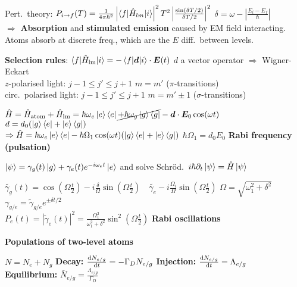 \begin{squishlist}
    \item Pert.\ theory: $P_{i\rightarrow f}(T) = \frac{1}{4\pi \hbar^2} \left|\braket{f|\ham_{lm}|i}\right|^2 T^2 \left|\frac{\sin(\delta T / 2)}{\delta T / 2}\right|^2$ \quad $\delta = \omega - \left|\frac{E_i - E_f}{\hbar}\right|$ \\
    $\Longrightarrow$ \textbf{Absorption} and \textbf{stimulated emission} caused by EM field interacting. \\
    Atoms absorb at discrete freq., which are the $E$ diff.\ between levels.
    \item \textbf{Selection rules}: $\braket{f|\ham_{\text{lm}}|i} = - \braket{f| \vec{d}|i} \cdot \vec{E}(t)$ \quad $d$ a vector operator $\Rightarrow$ Wigner-Eckart \\
    $z$-polarised light: \quad $j-1 \leq j' \leq j+1$ \quad $m = m'$ \quad ($\pi$-transitions) \\
    circ.\ polarised light: \quad $j-1 \leq j' \leq j+1$ \quad $m = m' \pm 1$ \quad ($\sigma$-transitions)
\end{squishlist}

\begin{squishlist}
    \item $\ham = \ham_{\text{atom}} + \ham_{\text{lm}} = \hbar \omega_e \ket{e}\bra{e} \cancel{+ \hbar \omega_g \ket{g}\bra{g}} - \vec{d}\cdot \vec{E}_0 \cos(\omega t)$ \quad $d = d_0 (\ket{g}\bra{e} + \ket{e}\bra{g})$ \\
    $\Rightarrow \ham = \hbar \omega_e \ket{e}\bra{e} - \hbar \Omega_1 \cos(\omega t)(\ket{g}\bra{e} + \ket{e}\bra{g})$ \quad $\hbar \Omega_1 = d_0 E_0$ \textbf{Rabi frequency (pulsation)}
    \item $\kpsi = \gamma_g(t)\ket{g} + \gamma_e(t)e^{-i\omega_e t} \ket{e}$ and solve Schröd.\ $i\hbar \partial_t \kpsi = \ham \kpsi$
    \item $\tilde{\gamma_g}(t) = \cos(\Omega \frac{t}{2}) - i \frac{\delta}{\Omega} \sin( \Omega \frac{t}{2}) \quad \tilde{\gamma_e}- i \frac{\Omega_i}{\Omega} \sin( \Omega \frac{t}{2})$ \qquad $\Omega = \sqrt{\omega_1^2 + \delta^2}$ \quad $\gamma_{g/e} = \tilde{\gamma}_{g/e}e^{\pm \delta t / 2}$ \\
    $P_e(t) = |\tilde{\gamma}_e(t)|^2 = \frac{\Omega_1^2}{\omega_1^2 + \delta^2} \sin^2(\Omega \frac{t}{2})$ \quad \textbf{Rabi oscillations}

    \squishline

    \textbf{Populations of two-level atoms}
    \item $N = N_e + N_g$ \quad \textbf{Decay:} $\der{t}{N_{e/g}} = - \Gamma_D N_{e/g}$ \quad \textbf{Injection:} $\der{t}{N_{e/g}} = \Lambda_{e/g}$ \\
    \textbf{Equilibrium:} $\bar{N}_{e/g} = \frac{\Lambda_{e/g}}{\Gamma_D}$
\end{squishlist}

